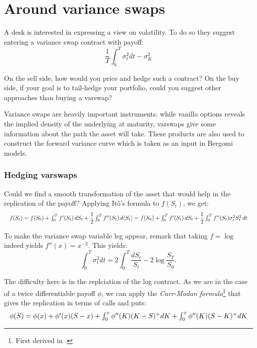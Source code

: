 \section{Around variance swaps}

\begin{tcolorbox}[width=\linewidth, sharp corners=all, colback=white!95!black]
    A desk is interested in expressing a view on volatility. To do so they suggest entering a variance swap contract with payoff:
    \[\dfrac{1}{T} \int_{0}^{T} \sigma_t^2 dt - \sigma_K^2\]

    On the sell side, how would you price and hedge such a contract?\newline
    On the buy side, if your goal is to tail-hedge your portfolio, could you suggest other approaches than buying a varswap?

\end{tcolorbox}

Variance swaps are heavily important instruments: while vanilla options reveals the implied density of the underlying at maturity, varswaps give some information about the path the asset will take. These products are also used to construct the forward variance curve which is taken as an input in Bergomi models.

\subsubsection*{Hedging varswaps}
Could we find a smooth transformation of the asset that would help in the replication of the payoff? Applying Itô's formula to $f(S_t)$, we get:
\begin{equation*}
        \resizebox{\hsize}{!}{$ f(S_t) = f(S_0) + \int_0^T f'(S_t) \,dS_t + \dfrac{1}{2} \int_0^T f''(S_t) \,d\langle S_t\rangle = f(S_0) + \int_0^T f'(S_t) \,dS_t + \dfrac{1}{2} \int_0^T f''(S_t) \sigma_t^2 S_t^2 \,dt $}
\end{equation*}


To make the variance swap variable leg appear, remark that taking $f = \log$ indeed yields $f''(x) = x^{-2}$.
This yields:
\[
    \int_{0}^{T} \sigma_t^2 dt = 2 \int_0^T \dfrac{dS_t}{S_t} - 2 \log \dfrac{S_T}{S_0}.
\]

The difficulty here is in the replciation of the log contract. As we are in the case of a twice differentiable payoff $\phi$, we can apply the \textit{Carr-Madan formula}\footnote{First derived in .} that gives the replication in terms of calls and puts:
\begin{equation*}\label{eqn:carr-madan}
    \resizebox{\hsize}{!}{$\phi(S) = \phi(x) + \phi'(x)(S-x) + \int_0^x \phi''(K)(K-S)^{+} dK + \int_0^x \phi''(K)(S-K)^{+} dK$}
\end{equation*}


